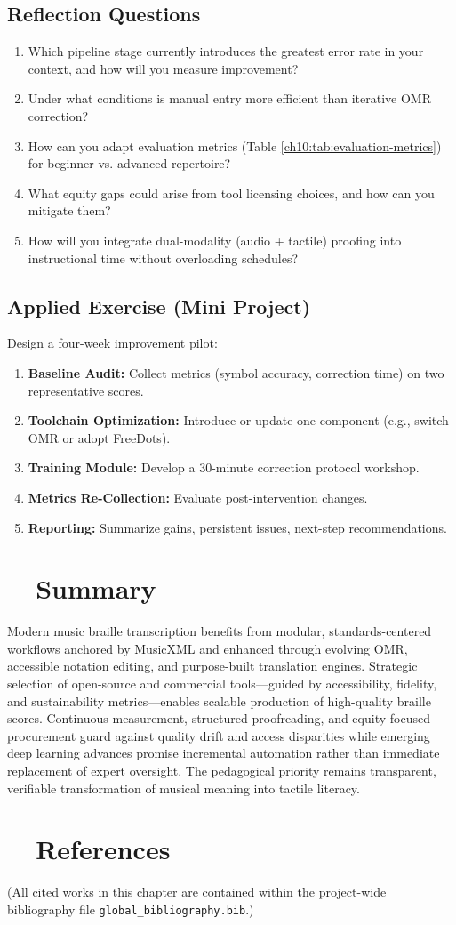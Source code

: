 \subsection*{Reflection Questions}
\begin{enumerate}
	\item Which pipeline stage currently introduces the greatest error rate in your context, and how will you measure improvement?
	\item Under what conditions is manual entry more efficient than iterative \gls{OMR} correction?
	\item How can you adapt evaluation metrics (Table \ref{ch10:tab:evaluation-metrics}) for beginner vs. advanced repertoire?
	\item What equity gaps could arise from tool licensing choices, and how can you mitigate them?
	\item How will you integrate dual-modality (audio + tactile) proofing into instructional time without overloading schedules?
\end{enumerate}

\subsection*{Applied Exercise (Mini Project)}
Design a four-week improvement pilot:
\begin{enumerate}
	\item \textbf{Baseline Audit:} Collect metrics (symbol accuracy, correction time) on two representative scores.
	\item \textbf{Toolchain Optimization:} Introduce or update one component (e.g., switch OMR or adopt FreeDots).
	\item \textbf{Training Module:} Develop a 30-minute correction protocol workshop.
	\item \textbf{Metrics Re-Collection:} Evaluate post-intervention changes.
	\item \textbf{Reporting:} Summarize gains, persistent issues, next-step recommendations.
\end{enumerate}

\section{~~Summary}\label{ch10:sec:summary}
Modern music braille transcription benefits from modular, standards-centered workflows anchored by \gls{MusicXML} and enhanced through evolving \gls{OMR}, accessible notation editing, and purpose-built translation engines.\supercite{daisy-musicxml, dancingdots-goodfeel, DuxburyDBT} Strategic selection of open-source and commercial tools—guided by accessibility, fidelity, and sustainability metrics—enables scalable production of high-quality braille scores. Continuous measurement, structured proofreading, and equity-focused procurement guard against quality drift and access disparities while emerging deep learning advances promise incremental automation rather than immediate replacement of expert oversight. The pedagogical priority remains transparent, verifiable transformation of musical meaning into tactile literacy.

\section{~~References}\label{ch10:sec:references}
\noindent (All cited works in this chapter are contained within the project-wide bibliography file \texttt{global\_bibliography.bib}.)
